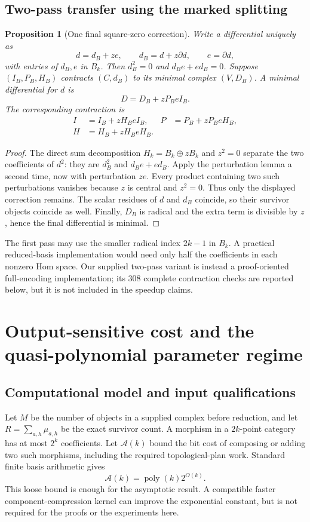 \documentclass[11pt,letterpaper]{article}
\newtheorem{proposition}[theorem]{Proposition}
\theoremstyle{definition}
\theoremstyle{remark}
\newcommand{\A}{\mathcal A}
\newcommand{\poly}{\operatorname{poly}}
\begin{document}
\subsection{Two-pass transfer using the marked splitting}
\begin{proposition}[One final square-zero correction]\label{prop:twopass}
Write a differential uniquely as
\[
 d=d_B+ze,\qquad d_B=d+z\partial d,\qquad e=\partial d,
\]
with entries of $d_B,e$ in $B_k$. Then
$d_B^2=0$ and $d_Be+ed_B=0$. Suppose
$(I_B,P_B,H_B)$ contracts $(C,d_B)$ to its minimal complex $(V,D_B)$.
A minimal differential for $d$ is
\begin{equation}\label{eq:twopass}
 D=D_B+zP_BeI_B.
\end{equation}
The corresponding contraction is
\begin{align*}
 I&=I_B+zH_BeI_B,& P&=P_B+zP_BeH_B,\\
 H&=H_B+zH_BeH_B.
\end{align*}
\end{proposition}
\begin{proof}
The direct sum decomposition $H_k=B_k\oplus zB_k$ and $z^2=0$ separate the
two coefficients of $d^2$: they are $d_B^2$ and $d_Be+ed_B$.
Apply the perturbation lemma a second time, now with perturbation $ze$.
Every product containing two such perturbations vanishes because $z$ is
central and $z^2=0$. Thus only the displayed correction remains.
The scalar residues of $d$ and $d_B$ coincide, so their survivor objects
coincide as well. Finally, $D_B$ is radical and the extra term is divisible by
$z$, hence the final differential is minimal.
\end{proof}

The first pass may use the smaller radical index $2k-1$ in $B_k$. A practical
reduced-basis implementation would need only half the coefficients in each
nonzero Hom space. Our supplied two-pass variant is instead a proof-oriented
full-encoding implementation; its 308 complete contraction checks are reported
below, but it is not included in the speedup claims.


\section{Output-sensitive cost and the quasi-polynomial parameter regime}
\label{sec:cost}
\subsection{Computational model and input qualifications}
Let $M$ be the number of objects in a supplied complex before reduction, and
let $R=\sum_{a,h}\mu_{a,h}$ be the exact survivor count. A morphism in a
$2k$-point category has at most $2^k$ coefficients. Let $\A(k)$ bound the
bit cost of composing or adding two such morphisms, including the required
topological-plan work. Standard finite basis arithmetic gives
\[
 \A(k)=\poly(k)2^{O(k)}.
\]
This loose bound is enough for the asymptotic result. A compatible faster
component-compression kernel can improve the exponential constant, but is not
required for the proofs or the experiments here.
\end{document}
